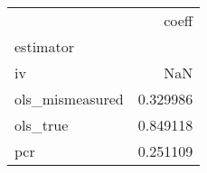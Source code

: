 \begin{tabular}{lr}
\toprule
{} &     coeff \\
estimator       &           \\
\midrule
iv              &       NaN \\
ols\_mismeasured &  0.329986 \\
ols\_true        &  0.849118 \\
pcr             &  0.251109 \\
\bottomrule
\end{tabular}
